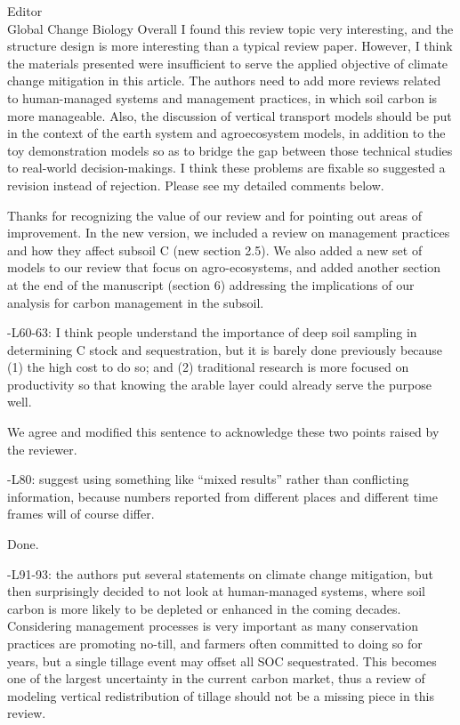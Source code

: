 \documentclass[11pt]{bgcletter}
\newcommand{\answer}[1] {
{\color{cyan} #1}
}
\begin{document}
\begin{letter}{Editor\\
   Global Change Biology
}
Overall I found this review topic very interesting, and the structure design is more interesting than a typical review paper. However, I think the materials presented were insufficient to serve the applied objective of climate change mitigation in this article. The authors need to add more reviews related to human-managed systems and management practices, in which soil carbon is more manageable. Also, the discussion of vertical transport models should be put in the context of the earth system and agroecosystem models, in addition to the toy demonstration models so as to bridge the gap between those technical studies to real-world decision-makings. I think these problems are fixable so suggested a revision instead of rejection. Please see my detailed comments below.

\answer{Thanks for recognizing the value of our review and for pointing out areas of improvement. In the new version, we included a review on management practices and how they affect subsoil C (new section 2.5). We also added a new set of models to our review that focus on agro-ecosystems, and added another section at the end of the manuscript (section 6) addressing the implications of our analysis for carbon management in the subsoil. }

-L60-63: I think people understand the importance of deep soil sampling in determining C stock and sequestration, but it is barely done previously because (1) the high cost to do so; and (2) traditional research is more focused on productivity so that knowing the arable layer could already serve the purpose well.

\answer{We agree and modified this sentence to acknowledge these two points raised by the reviewer. }

-L80: suggest using something like ``mixed results'' rather than conflicting information, because numbers reported from different places and different time frames will of course differ.

\answer{Done.}

-L91-93: the authors put several statements on climate change mitigation, but then surprisingly decided to not look at human-managed systems, where soil carbon is more likely to be depleted or enhanced in the coming decades. Considering management processes is very important as many conservation practices are promoting no-till, and farmers often committed to doing so for years, but a single tillage event may offset all SOC sequestrated. This becomes one of the largest uncertainty in the current carbon market, thus a review of modeling vertical redistribution of tillage should not be a missing piece in this review.


\end{letter}
\end{document}

